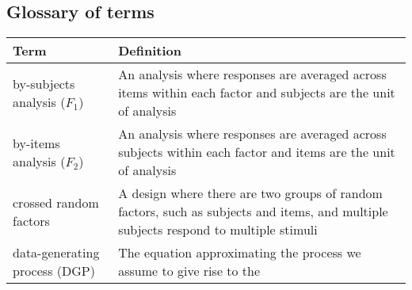 \clearpage



\begin{appendix}
\hypertarget{glossary-of-terms}{%
\section{Glossary of terms}\label{glossary-of-terms}}

\begin{longtable}[]{@{}ll@{}}
\toprule
\begin{minipage}[b]{0.27\columnwidth}\raggedright
Term\strut
\end{minipage} & \begin{minipage}[b]{0.67\columnwidth}\raggedright
Definition\strut
\end{minipage}\tabularnewline
\midrule
\endhead
\begin{minipage}[t]{0.27\columnwidth}\raggedright
by-subjects analysis (\(F_1\))\strut
\end{minipage} & \begin{minipage}[t]{0.67\columnwidth}\raggedright
An analysis where responses are averaged across items within each factor
and subjects are the unit of analysis\strut
\end{minipage}\tabularnewline
\begin{minipage}[t]{0.27\columnwidth}\raggedright
by-items analysis (\(F_2\))\strut
\end{minipage} & \begin{minipage}[t]{0.67\columnwidth}\raggedright
An analysis where responses are averaged across subjects within each
factor and items are the unit of analysis\strut
\end{minipage}\tabularnewline
\begin{minipage}[t]{0.27\columnwidth}\raggedright
crossed random factors\strut
\end{minipage} & \begin{minipage}[t]{0.67\columnwidth}\raggedright
A design where there are two groups of random factors, such as subjects
and items, and multiple subjects respond to multiple stimuli\strut
\end{minipage}\tabularnewline
\begin{minipage}[t]{0.27\columnwidth}\raggedright
data-generating process (DGP)\strut
\end{minipage} & \begin{minipage}[t]{0.67\columnwidth}\raggedright
The equation approximating the process we assume to give rise to the

\end{minipage}
\end{longtable}
\end{appendix}
